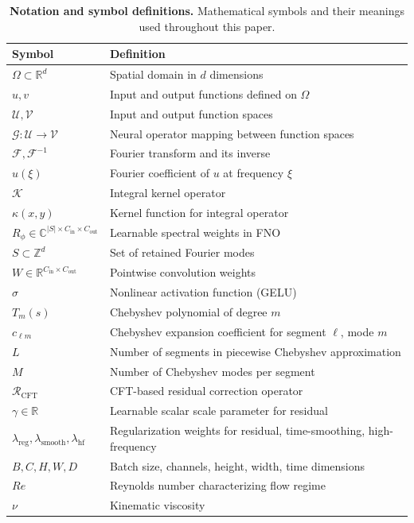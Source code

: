 \documentclass[11pt]{article}
\newcommand{\R}{\mathbb{R}}
\newcommand{\C}{\mathbb{C}}
\newcommand{\F}{\mathcal{F}}
\newcommand{\G}{\mathcal{G}}
\newcommand{\K}{\mathcal{K}}
\begin{document}
\begin{table}[h]
\centering
\caption{\textbf{Notation and symbol definitions.} Mathematical symbols and their meanings used throughout this paper.}
\label{tab:notation}
\small
\begin{tabular}{@{}p{2.5cm}p{10cm}@{}}
\toprule
\textbf{Symbol} & \textbf{Definition} \\
\midrule
$\Omega \subset \R^d$ & Spatial domain in $d$ dimensions \\
$u, v$ & Input and output functions defined on $\Omega$ \\
$\mathcal{U}, \mathcal{V}$ & Input and output function spaces \\
$\G: \mathcal{U} \to \mathcal{V}$ & Neural operator mapping between function spaces \\
$\F, \F^{-1}$ & Fourier transform and its inverse \\
$\hat{u}(\xi)$ & Fourier coefficient of $u$ at frequency $\xi$ \\
$\K$ & Integral kernel operator \\
$\kappa(x,y)$ & Kernel function for integral operator \\
$R_\phi \in \C^{|S| \times C_{\text{in}} \times C_{\text{out}}}$ & Learnable spectral weights in FNO \\
$S \subset \mathbb{Z}^d$ & Set of retained Fourier modes \\
$W \in \R^{C_{\text{in}} \times C_{\text{out}}}$ & Pointwise convolution weights \\
$\sigma$ & Nonlinear activation function (GELU) \\
$T_m(s)$ & Chebyshev polynomial of degree $m$ \\
$c_{\ell m}$ & Chebyshev expansion coefficient for segment $\ell$, mode $m$ \\
$L$ & Number of segments in piecewise Chebyshev approximation \\
$M$ & Number of Chebyshev modes per segment \\
$\mathcal{R}_{\text{CFT}}$ & CFT-based residual correction operator \\
$\gamma \in \R$ & Learnable scalar scale parameter for residual \\
$\lambda_{\text{reg}}, \lambda_{\text{smooth}}, \lambda_{\text{hf}}$ & Regularization weights for residual, time-smoothing, high-frequency \\
$B, C, H, W, D$ & Batch size, channels, height, width, time dimensions \\
$Re$ & Reynolds number characterizing flow regime \\
$\nu$ & Kinematic viscosity \\
\bottomrule
\end{tabular}
\end{table}
\end{document}
